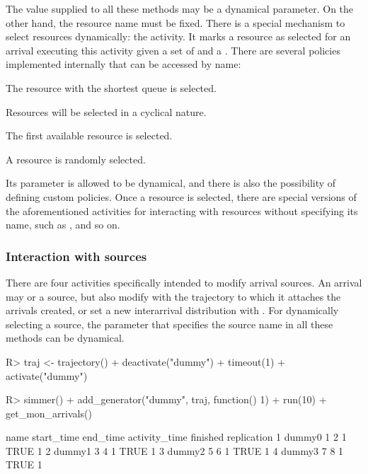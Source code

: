 \documentclass[
  nojss]{jss}
\providecommand{\tightlist}{%
  \setlength{\itemsep}{0pt}\setlength{\parskip}{0pt}}
\begin{document}
The value supplied to all these methods may be a dynamical parameter. On
the other hand, the resource name must be fixed. There is a special
mechanism to select resources dynamically: the  activity.
It marks a resource as selected for an arrival executing this activity
given a set of  and a . There are several
policies implemented internally that can be accessed by name:

\begin{description}
\tightlist
\item[shortest-queue]
The resource with the shortest queue is selected.
\item[round-robin]
Resources will be selected in a cyclical nature.
\item[first-available]
The first available resource is selected.
\item[random]
A resource is randomly selected.
\end{description}

Its  parameter is allowed to be dynamical, and there is
also the possibility of defining custom policies. Once a resource is
selected, there are special versions of the aforementioned activities
for interacting with resources without specifying its name, such as
,  and so on.

\subsubsection{Interaction with sources}\label{interaction-with-sources}

There are four activities specifically intended to modify arrival
sources. An arrival may  or  a
source, but also modify with  the trajectory to
which it attaches the arrivals created, or set a new interarrival
distribution with . For dynamically selecting a
source, the parameter that specifies the source name in all these
methods can be dynamical.

\begin{CodeChunk}
\begin{CodeInput}
R> traj <- trajectory() %
+   deactivate("dummy") %
+   timeout(1) %
+   activate("dummy")
\end{CodeInput}
\end{CodeChunk}

\begin{CodeChunk}
\begin{CodeInput}
R> simmer() %
+   add_generator("dummy", traj, function() 1) %
+   run(10) %
+   get_mon_arrivals()
\end{CodeInput}
\begin{CodeOutput}
    name start_time end_time activity_time finished replication
1 dummy0          1        2             1     TRUE           1
2 dummy1          3        4             1     TRUE           1
3 dummy2          5        6             1     TRUE           1
4 dummy3          7        8             1     TRUE           1
\end{CodeOutput}
\end{CodeChunk}
\end{document}
